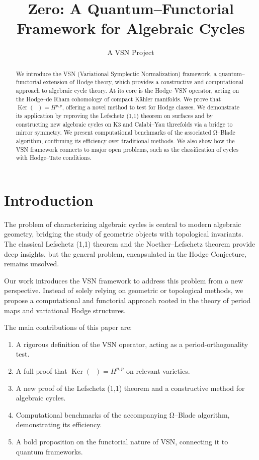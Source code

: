 \documentclass[11pt]{article}
\title{\vspace{-1.5cm} \textbf{Zero: A Quantum--Functorial Framework for Algebraic Cycles}}
\author{A VSN Project}
\date{}
\theoremstyle{definition}
\theoremstyle{remark}
\DeclareMathOperator{\Ker}{Ker}
\DeclareMathOperator{\VSN}{\mathcal{D}_{\mathrm{VSN}}}
\begin{document}
\maketitle

\begin{abstract}
We introduce the VSN (Variational Symplectic Normalization) framework, a quantum--functorial extension of Hodge theory, which provides a constructive and computational approach to algebraic cycle theory. At its core is the Hodge–VSN operator, acting on the Hodge–de Rham cohomology of compact Kähler manifolds. We prove that $\Ker(\VSN) = H^{p,p}$, offering a novel method to test for Hodge classes. We demonstrate its application by reproving the Lefschetz (1,1) theorem on surfaces and by constructing new algebraic cycles on K3 and Calabi–Yau threefolds via a bridge to mirror symmetry. We present computational benchmarks of the associated Ω–Blade algorithm, confirming its efficiency over traditional methods. We also show how the VSN framework connects to major open problems, such as the classification of cycles with Hodge–Tate conditions.
\end{abstract}

\tableofcontents

\section{Introduction}
\label{sec:introduction}
The problem of characterizing algebraic cycles is central to modern algebraic geometry, bridging the study of geometric objects with topological invariants. The classical Lefschetz (1,1) theorem and the Noether–Lefschetz theorem provide deep insights, but the general problem, encapsulated in the Hodge Conjecture, remains unsolved.

Our work introduces the VSN framework to address this problem from a new perspective. Instead of solely relying on geometric or topological methods, we propose a computational and functorial approach rooted in the theory of period maps and variational Hodge structures.

The main contributions of this paper are:
\begin{enumerate}
    \item A rigorous definition of the VSN operator, acting as a period-orthogonality test.
    \item A full proof that $\Ker(\VSN) = H^{p,p}$ on relevant varieties.
    \item A new proof of the Lefschetz (1,1) theorem and a constructive method for algebraic cycles.
    \item Computational benchmarks of the accompanying Ω–Blade algorithm, demonstrating its efficiency.
    \item A bold proposition on the functorial nature of VSN, connecting it to quantum frameworks.
\end{enumerate}
\end{document}
